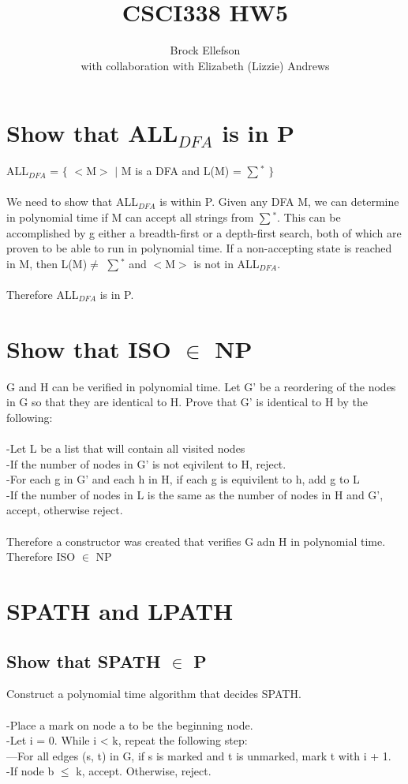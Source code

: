 \documentclass[10pt,a4paper]{article}
\author{Brock Ellefson \\ with collaboration with Elizabeth (Lizzie) Andrews}
\title{CSCI338 HW5}
\begin{document}
\maketitle

\section{Show that ALL$_{DFA}$ is in P}
ALL$_{DFA}$ = $\lbrace$ $<$M$>$ $\mid$ M is a DFA and L(M) = $\sum$$^{\ast}$ $\rbrace$
\\\\
We need to show that ALL$_{DFA}$ is within P. Given any DFA M, we can
determine in polynomial time if M can accept all strings from $\sum$$^{\ast}$. This can be accomplished by g either
a breadth-first or a depth-first search, both of which are proven to be able to run in polynomial
time. If a non-accepting state is reached in M, then L(M)$\neq$ $\sum$$^{\ast}$ and $<$M$>$ is not in ALL$_{DFA}$.\\
\\
Therefore ALL$_{DFA}$ is in P.

\section{Show that ISO $\in$ NP}
G and H can be verified in polynomial time. Let G'
be a reordering of the nodes in G so that they are identical to H. Prove that G' is
identical to H by the following:\\
\\
-Let L be a list that will contain all visited nodes\\
-If the number of nodes in G' is not eqivilent to H, reject.\\
-For each g in G' and each h in H, if each g is equivilent to h, add g to L\\
-If the number of nodes in L is the same as the number of nodes in H and G', accept,
otherwise reject.\\
\\
Therefore a constructor was created that verifies G adn H in polynomial time.\\
Therefore ISO $\in$ NP

\section{SPATH and LPATH}
\subsection{Show that SPATH $\in$ P}
Construct a polynomial time algorithm that decides SPATH.\\
\\
-Place a mark on node a to be the beginning node.\\
-Let i = 0. While i < k, repeat the following step:\\
---For all edges (s, t) in G, if s is marked and t is unmarked, mark t with i + 1.\\
-If node b $\leq$ k, accept. Otherwise, reject.\\
\end{document}
